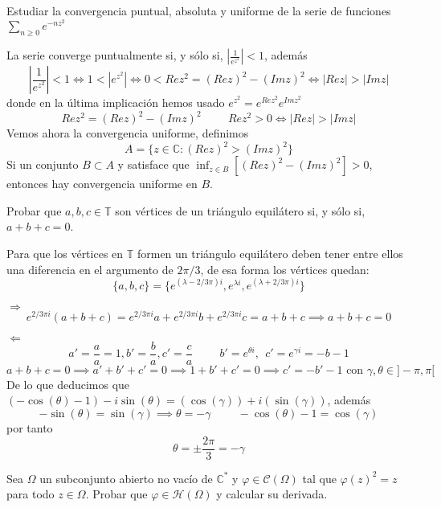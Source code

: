 \begin{ejer}
	Estudiar la convergencia puntual, absoluta y uniforme de la serie de funciones $\sum_{n\geq 0} e^{-nz^2}$
\end{ejer}

\begin{sol}
La serie converge puntualmente si, y sólo si, $\left| \frac{1}{e^{z^2}} \right| <1$, además
$$\left| \frac{1}{e^{z^2}} \right| <1 \Longleftrightarrow 1<|e^{z^2}|  \Longleftrightarrow 0<Rez^2 = (Rez)^2-(Imz)^2 
\Longleftrightarrow |Rez| > |Imz|$$
donde en la última implicación hemos usado
$e^{z^2} = e^{Rez^2} e^{Imz^2}$
$$Rez^2 = (Rez)^2 - (Imz)^2 \hspace{1cm}Rez^2>0 \Longleftrightarrow |Rez| > |Imz|$$
Vemos ahora la convergencia uniforme, definimos
$$A = \{ z\in\mathbb{C} : (Rez)^2>(Imz)^2 \}$$
Si un conjunto $B\subset A$ y satisface que $\inf_{z\in B} [ (Rez)^2-(Imz)^2 ] > 0$, entonces hay convergencia uniforme en $B$.
\end{sol}



\begin{ejer}
	Probar que $a, b, c \in\mathbb{T}$ son vértices de un triángulo equilátero si, y sólo si, $a+b+c = 0$.
\end{ejer}

\begin{sol}
Para que los vértices en $\mathbb{T}$ formen un triángulo equilátero deben tener entre ellos una diferencia en el argumento de $2\pi/3$, de esa forma los vértices quedan:
$$\{ a,b,c \} = \{ e^{(\lambda - 2/3\pi)i}, e^{\lambda i}, e^{(\lambda + 2/3\pi)i} \}$$

$\Longrightarrow$
$$e^{2/3\pi i} (a+b+c) = e^{2/3\pi i} a + e^{2/3\pi i}b + e^{2/3\pi i}c = a+b+c \implies a+b+c=0$$

$\Longleftarrow$
$$a'=\frac{a}{a} = 1, b'=\frac{b}{a}, c'=\frac{c}{a} \hspace{1cm} b'=e^{\theta i} , \ \ c' = e^{\gamma i} = -b-1$$
$$a+b+c = 0 \implies a'+b'+c' = 0 \implies 1+b'+c' = 0 \implies c'=-b'-1 \text{ con }\gamma,\theta\in ]-\pi,\pi[$$
De lo que deducimos que 
$(-\cos(\theta)-1)-i\sin(\theta) = (\cos(\gamma)) + i(\sin(\gamma))$, además
$$-\sin(\theta) = \sin(\gamma) \implies \theta = -\gamma 
\hspace{1cm}-\cos(\theta) -1 =  \cos(\gamma)$$
por tanto
$$\theta = \pm\frac{2\pi}{3} = -\gamma$$
\end{sol}




\begin{ejer}
	Sea $\Omega$ un subconjunto abierto no vacío de $\mathbb{C}^{\ast}$ y $\varphi\in\mathcal{C}(\Omega)$ tal que $\varphi(z)^2 = z$ para todo $z\in\Omega$. Probar que $\varphi\in\mathcal{H}(\Omega)$ y calcular su derivada.
\end{ejer}

